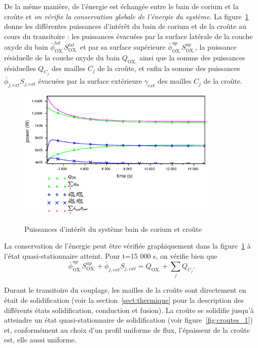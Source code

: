 De la même manière, de l'énergie est échangée entre le bain de corium et la croûte et \emph{on vérifie la conservation globale de l'énergie du système}. La figure~\ref{fig:thermal_balance} donne les différentes puissances d'intérêt du bain de corium et de la croûte au cours du transitoire : les puissances évacuées par la surface latérale de la couche oxyde du bain $\bar{\phi}^{lat}_\textrm{OX.}S^{lat}_\textrm{OX.}$ et par sa surface supérieure $\bar{\phi}^{up}_\textrm{OX.}S^{up}_\textrm{OX.}$, la puissance résiduelle de la couche oxyde du bain $Q_\textrm{OX.}$ ainsi que la somme des puissances résiduelles $Q_{C_j}$ des mailles $C_j$ de la croûte, et enfin la somme des puissances $\bar{\phi}_{j,ext}S_{j,ext}$ évacuées par la surface extérieure $\gamma_{ext}$ des mailles $C_j$ de la croûte.
\begin{figure}[H]
\centering
\includegraphics[width=0.85\textwidth, keepaspectratio=true]{Figures/thermal_balance.eps}\\
\caption{Puissances d'intérêt du système bain de corium et croûte}
\label{fig:thermal_balance}
\end{figure}
La conservation de l'énergie peut être vérifiée graphiquement dans la figure~\ref{fig:thermal_balance} à l'état quasi-stationnaire atteint. Pour t=15 000 s, on vérifie bien que
\begin{equation}
\bar{\phi}^{up}_\textrm{OX.}S^{up}_\textrm{OX.} + \bar{\phi}_{j,ext}S_{j,ext} = Q_\textrm{OX.} + \sum_j Q_{C_j}.
\end{equation}

Durant le transitoire du couplage, les mailles de la croûte sont directement en était de solidification (voir la section~\ref{sect:thermique} pour la description des différents états solidification, conduction et fusion). La croûte se solidifie jusqu'à atteindre un état quasi-stationnaire de solidification (voir figure~\ref{fig:croutes_1}) et, conformément au choix d'un profil uniforme de flux, l'épaisseur de la croûte est, elle aussi uniforme.

